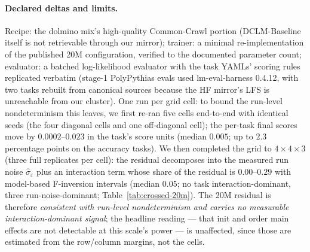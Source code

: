 \paragraph{Declared deltas and limits.}
Recipe: the dolmino mix's high-quality Common-Crawl portion (DCLM-Baseline itself is not
retrievable through our mirror); trainer: a minimal re-implementation of the published 20M
configuration, verified to the documented parameter count; evaluator: a batched log-likelihood
evaluator with the task YAMLs' scoring rules replicated verbatim (stage-1 PolyPythias evals
used lm-eval-harness 0.4.12, with two tasks rebuilt from canonical sources because the HF
mirror's LFS is unreachable from our cluster). One run per grid cell: to bound the run-level
nondeterminism this leaves, we first re-ran five cells end-to-end with identical seeds (the four
diagonal cells and one off-diagonal cell); the per-task
final scores move by $0.0002$--$0.023$ in the task's score units (median $0.005$; up to
$2.3$ percentage points on the accuracy tasks). We then completed the grid to
$4{\times}4{\times}3$ (three full replicates per cell): the residual decomposes into the
measured run noise $\hat\sigma_\varepsilon$ plus an interaction term whose share of the
residual is $0.00$--$0.29$ with model-based F-inversion intervals (median $0.05$; no task
interaction-dominant, three run-noise-dominant; Table~\ref{tab:crossed-20m}). The 20M residual is therefore \emph{consistent with run-level nondeterminism and carries no measurable interaction-dominant signal};
the headline reading --- that init and order main effects are not detectable at this
scale's power --- is unaffected, since those are estimated from the row/column margins, not the cells.
